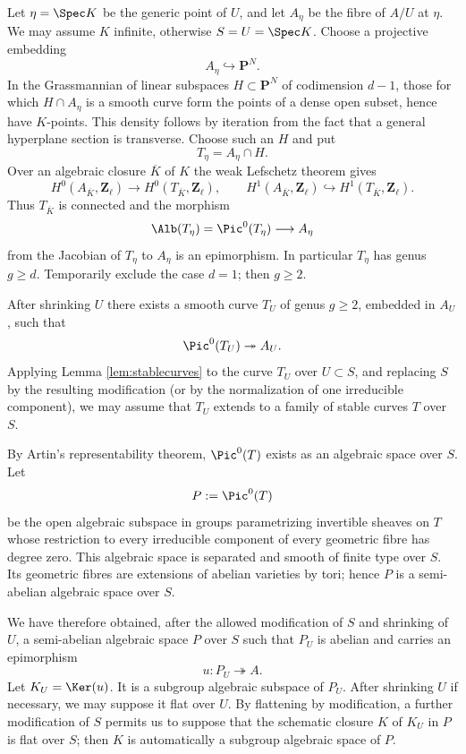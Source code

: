 Let $\eta=\Spec K$ be the generic point of $U$, and let $A_\eta$ be the fibre of $A/U$ at $\eta$. We may assume $K$ infinite, otherwise $S=U=\Spec K$. Choose a projective embedding
\[
  A_\eta \hookrightarrow \mathbf P^N.
\]
In the Grassmannian of linear subspaces $H\subset \mathbf P^N$ of codimension $d-1$, those for which $H\cap A_\eta$ is a smooth curve form the points of a dense open subset, hence have $K$-points. This density follows by iteration from the fact that a general hyperplane section is transverse. Choose such an $H$ and put
\[
  T_\eta=A_\eta\cap H.
\]
Over an algebraic closure $\overline K$ of $K$ the weak Lefschetz theorem gives
\[
  H^0(A_{\overline K},\mathbf Z_\ell)\longrightarrow H^0(T_{\overline K},\mathbf Z_\ell),
  \qquad
  H^1(A_{\overline K},\mathbf Z_\ell)\hookrightarrow H^1(T_{\overline K},\mathbf Z_\ell).
\]
Thus $T_{\overline K}$ is connected and the morphism
\[
  \Alb(T_\eta)=\Pic^0(T_\eta)\longrightarrow A_\eta
\]
from the Jacobian of $T_\eta$ to $A_\eta$ is an epimorphism. In particular $T_\eta$ has genus $g\ge d$. Temporarily exclude the case $d=1$; then $g\ge2$.

After shrinking $U$ there exists a smooth curve $T_U$ of genus $g\ge2$, embedded in $A_U$, such that
\[
  \Pic^0(T_U)\twoheadrightarrow A_U.
\]
Applying Lemma \ref{lem:stablecurves} to the curve $T_U$ over $U\subset S$, and replacing $S$ by the resulting modification (or by the normalization of one irreducible component), we may assume that $T_U$ extends to a family of stable curves $T$ over $S$.

By Artin's representability theorem, $\Pic^0(T)$ exists as an algebraic space over $S$. Let
\[
  P:=\Pic^0(T)
\]
be the open algebraic subspace in groups parametrizing invertible sheaves on $T$ whose restriction to every irreducible component of every geometric fibre has degree zero. This algebraic space is separated and smooth of finite type over $S$. Its geometric fibres are extensions of abelian varieties by tori; hence $P$ is a semi-abelian algebraic space over $S$.

We have therefore obtained, after the allowed modification of $S$ and shrinking of $U$, a semi-abelian algebraic space $P$ over $S$ such that $P_U$ is abelian and carries an epimorphism
\[
  u:P_U\twoheadrightarrow A.
\]
Let $K_U=\Ker(u)$. It is a subgroup algebraic subspace of $P_U$. After shrinking $U$ if necessary, we may suppose it flat over $U$. By flattening by modification, a further modification of $S$ permits us to suppose that the schematic closure $K$ of $K_U$ in $P$ is flat over $S$; then $K$ is automatically a subgroup algebraic space of $P$.

